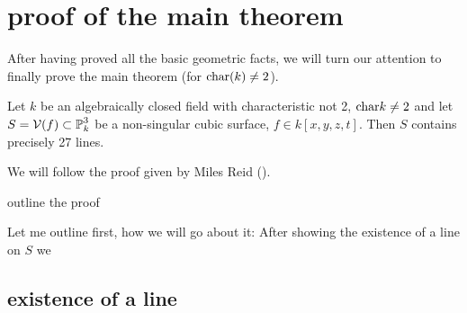 \section{proof of the main theorem}

After having proved all the basic geometric facts, we will turn our attention to finally prove the main theorem (for ${\operatorname{char}}(k) \neq 2$).
\begin{theorem}
Let $k$ be an algebraically closed field with characteristic not 2, ${\operatorname{char}} k \neq 2$ and let $S = \operatorname{\mathcal V}(f) \subset \operatorname{\mathbb P}^3_k$ be a non-singular cubic surface, $f\in k[x,y,z,t]$.
Then $S$ contains precisely 27 lines.
\end{theorem}
We will follow the proof given by Miles Reid (\cite[§7]{reid1988undergraduate}).
\begin{todo}
\item outline the proof
\item Let me outline first, how we will go about it:
After showing the existence of a line on $S$ we 
\end{todo}


\subsection{existence of a line}


